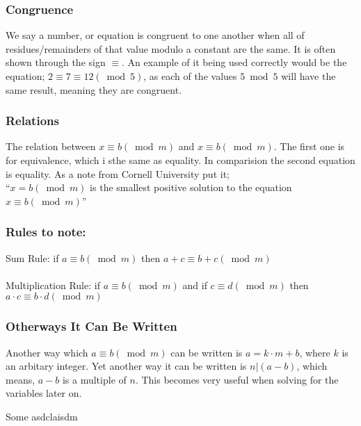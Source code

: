 \documentclass[12pft, english]{article}
\begin{document}
\begin{multicols}{2}
  \subsubsection{Congruence}
  We say a number, or equation is congruent to one another when all of residues/remainders of that value modulo a constant are the same. It is often shown through the sign \( \equiv \). An example of it being used correctly would be the equation; \( 2 \equiv 7 \equiv 12 (\bmod 5)\), as each of the values \( 5 \bmod 5\) will have the same result, meaning they are congruent. \citep{modArth}
  \subsubsection{Relations}
  The relation between \(x \equiv b (\bmod m)\) and \(x \equiv b (\bmod m )\). The first one is for equivalence, which i sthe same as equality. In comparision the second equation is equality. As a note from Cornell University put it; \\ ``\(x = b (\bmod m)\) is the smallest positive solution to the equation \( x \equiv b (\bmod m)\)'' \cite{cornelMod}
  \subsubsection{Rules to note:}
  Sum Rule: if \(a \equiv b ( \bmod m)\) then \( a + c \equiv b + c(\bmod m)\) \cite{cornelMod} \\ \\
  Multiplication Rule: if \(a \equiv b (\bmod m)\) and if \(c \equiv d (\bmod m)\) then \( a \cdot c \equiv b \cdot d (\bmod m)\)  \cite{cornelMod} \\

  \subsubsection{Otherways It Can Be Written }
  Another way which \( a \equiv b (\bmod m)\) can be written is \(a = k \cdot m + b\), where \(k\) is an arbitary integer. Yet another way it can be written is \(n | (a-b) \), which means, \(a-b\) is a multiple of \(n\). This becomes very useful when solving for the variables later on.

\end{multicols}

Some asdclaisdm \citep{example}

\citet{waterlooMCG}

\citet{whack}



\end{document}
